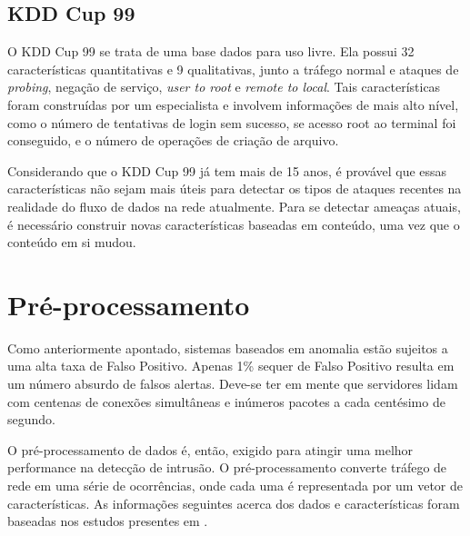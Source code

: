 \subsection{KDD Cup 99}
O KDD Cup 99 se trata de uma base dados para uso livre. Ela possui 32 características quantitativas e
9 qualitativas, junto a tráfego normal e ataques de \textit{probing}, negação de serviço, \textit{user to root} e
\textit{remote to local}.  Tais características foram construídas por um especialista e involvem informações de mais
alto nível, como o número de tentativas de login sem sucesso, se acesso root ao terminal foi conseguido,
e o número de operações de criação de arquivo.
\par Considerando que o KDD Cup 99 já tem mais de 15 anos, é provável que essas características não sejam mais úteis
para detectar os tipos de ataques recentes na realidade do fluxo de dados na rede atualmente. Para se detectar
ameaças atuais, é necessário construir novas características baseadas em conteúdo, uma vez que o conteúdo em si mudou.


\section{Pré-processamento}
Como anteriormente apontado, sistemas baseados em anomalia estão sujeitos a uma alta taxa de Falso Positivo. Apenas
1\% sequer de Falso Positivo resulta em um número absurdo de falsos alertas. Deve-se ter em mente que servidores lidam
com centenas de conexões simultâneas e inúmeros pacotes a cada centésimo de segundo.
\par O pré-processamento de dados é, então, exigido para atingir uma melhor performance na detecção de intrusão.
O pré-processamento converte tráfego de rede em uma série de ocorrências, onde cada uma é representada por um vetor
de características. As informações seguintes acerca dos dados e características foram baseadas nos estudos presentes
em \cite{davis11}.

